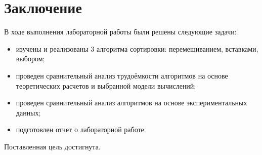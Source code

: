 \chapter*{Заключение}

В ходе выполнения лабораторной работы были решены следующие задачи:

\begin{itemize}
	\item изучены и реализованы 3 алгоритма сортировки: перемешиванием, вставками, выбором;
	\item проведен сравнительный анализ трудоёмкости алгоритмов на основе теоретических расчетов и выбранной модели вычислений;
	\item проведен сравнительный анализ алгоритмов на основе экспериментальных данных;
	\item подготовлен отчет о лабораторной работе.
\end{itemize}

Поставленная цель достигнута.

